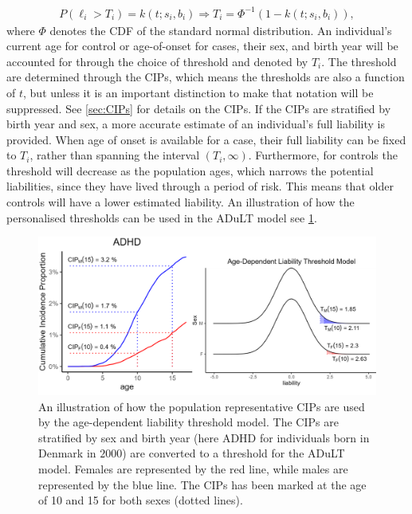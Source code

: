 \begin{align*}
P\left( \ell_i > T_i \right) = k(t; s_i, b_i) \Rightarrow T_i = \Phi^{-1} \left(1 - k(t; s_i, b_i) \right),
\end{align*}
where $ \Phi $ denotes the CDF of the standard normal distribution. An individual's current age for control or age-of-onset for cases, their sex, and birth year will be accounted for through the choice of threshold and denoted by $ T_i $. The threshold are determined through the CIPs, which means the thresholds are also a function of $ t $, but unless it is an important distinction to make that notation will be suppressed. See \cref{sec:CIPs} for details on the CIPs. If the CIPs are stratified by birth year and sex, a more accurate estimate of an individual's full liability is provided. When age of onset is available for a case, their full liability can be fixed to $ T_i $, rather than spanning the interval $ (T_i, \infty) $. Furthermore, for controls the threshold will decrease as the population ages, which narrows the potential liabilities, since they have lived through a period of risk. This means that older controls will have a lower estimated liability. An illustration of how the personalised thresholds can be used in the ADuLT model see \cref{fig:adult_connection_to_CIPs}.

\begin{figure}[h]
	\includegraphics[width=\textwidth]{methods/adult_top.png}
	\caption[Age-dependent liability threshold model and its relationship to the CIPs]{An illustration of how the population representative CIPs are used by the age-dependent liability threshold model. The CIPs are stratified by sex and birth year (here ADHD for individuals born in Denmark in $ 2000 $) are converted to a threshold for the ADuLT model. Females are represented by the red line, while males are represented by the blue line. The CIPs has been marked at the age of 10 and 15 for both sexes (dotted lines).}
	\label{fig:adult_connection_to_CIPs}
\end{figure}

